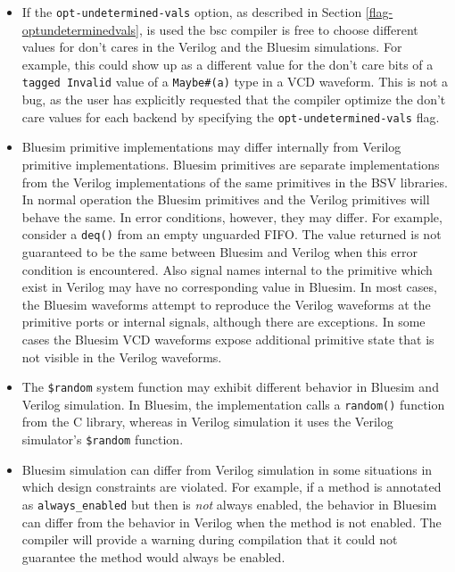 \documentclass{article}
\newcommand{\te}[1]{\texttt{#1}}
\begin{document}
\begin{itemize}

\item  If the \te{opt-undetermined-vals} option, as described
in Section \ref{flag-optundeterminedvals}, is used the bsc
compiler is free to choose  different values for don't cares in  the
Verilog  and the Bluesim simulations.  For example,  this  could show up as
a different value for the don't care bits of a \te{tagged Invalid}
value of a \te{Maybe\#(a)} type in a VCD waveform.  This
is not a bug, as the user has explicitly requested that the compiler
optimize the don't care values for each backend by specifying the
\te{opt-undetermined-vals} flag.



\item Bluesim primitive implementations may differ internally from
Verilog primitive implementations.  Bluesim primitives are separate
implementations from the Verilog implementations of the same
primitives in the BSV libraries.  In normal operation the Bluesim
primitives and the Verilog primitives will behave the same.  In error
conditions, however, they may differ.  For example, consider a \te{deq()} from an
empty unguarded FIFO.  The value returned is not guaranteed to be the
same between Bluesim and Verilog when this error condition is
encountered.  Also signal names internal to the primitive which exist in
Verilog may have no corresponding value in Bluesim. In most cases, the
Bluesim waveforms attempt to reproduce the Verilog waveforms at the
primitive ports or internal signals, although there are exceptions.
In some cases the Bluesim VCD waveforms expose additional primitive
state that is not visible in the Verilog waveforms. 

\item  The \te{\$random} system function may exhibit different
behavior in Bluesim and Verilog 
simulation.  In Bluesim, the implementation calls a \te{random()} function from
the C library, whereas in Verilog simulation it uses the Verilog simulator's
\te{\$random} function.  %



\item Bluesim simulation can differ from Verilog simulation in some
situations in which design constraints are violated.  For example, if
a method is annotated as \te{always\_enabled} but then is {\em not}
always enabled, the behavior in Bluesim can differ from the behavior
in Verilog when the method is not enabled.  The compiler will provide
a warning during compilation that it could not guarantee the method
would  always be enabled.


\end{itemize}
\end{document}
